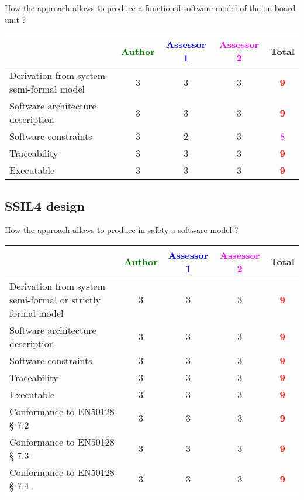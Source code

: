How the approach allows to  produce a functional software model of the on-board unit ?

\begin{tabular}{|l | c | c | c | c|}
\hline
& \textcolor{green}{Author} & \textcolor{blue}{Assessor 1} & \textcolor{magenta}{Assessor 2} & Total \\
\hline
Derivation from system semi-formal model  & 3     & 3     &3 & \textcolor{red}{\textbf{9}} \\
\hline 
Software architecture description  & 3     & 3     &3 & \textcolor{red}{\textbf{9}} \\
\hline
Software constraints  & 3     & 2     &3 & \textcolor{magenta}{8} \\
\hline
Traceability  & 3     & 3     &3 & \textcolor{red}{\textbf{9}} \\
\hline
Executable  & 3     & 3     &3 & \textcolor{red}{\textbf{9}} \\
\hline
\end{tabular}

\subsection{SSIL4 design}

How the approach allows to  produce in safety a software model ?

\begin{tabular}{|l | c | c | c | c|}
\hline
& \textcolor{green}{Author} & \textcolor{blue}{Assessor 1} & \textcolor{magenta}{Assessor 2} & Total \\
\hline
Derivation from system semi-formal or strictly formal model  &
3 & 3     &3 & \textcolor{red}{\textbf{9}} \\
\hline 
Software architecture description  & 3     & 3     &3 & \textcolor{red}{\textbf{9}} \\
\hline
Software constraints  & 3     & 3     &3 & \textcolor{red}{\textbf{9}} \\
\hline
Traceability  & 3     & 3     &3 & \textcolor{red}{\textbf{9}} \\
\hline
Executable  & 3     & 3     &3 & \textcolor{red}{\textbf{9}} \\
\hline
Conformance to EN50128 § 7.2  & 3     & 3     &3 & \textcolor{red}{\textbf{9}} \\
\hline
Conformance to EN50128 § 7.3  & 3     & 3     &3 & \textcolor{red}{\textbf{9}} \\
\hline
Conformance to EN50128 § 7.4  & 3    & 3     &3 & \textcolor{red}{\textbf{9}} \\
\hline
\end{tabular}

